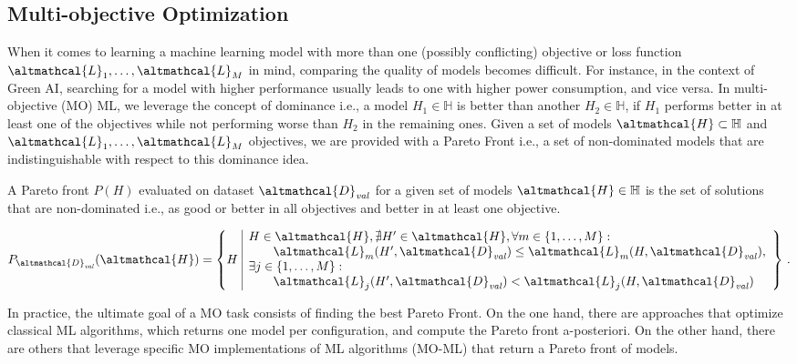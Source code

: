 \subsection{Multi-objective Optimization}


When it comes to learning a machine learning model with more than one (possibly conflicting) objective or loss function $\altmathcal{L}_1, \dots, \altmathcal{L}_M$ in mind, comparing the quality of models becomes difficult.
For instance, in the context of Green AI, searching for a model with higher performance usually leads to one with higher power consumption, and vice versa.
In multi-objective (MO) ML, we leverage the concept of dominance i.e., a model $H_1 \in \mathbb{H}$ is better than another $H_2 \in \mathbb{H}$, if $H_1$ performs better in at least one of the objectives while not performing worse than $H_2$ in the remaining ones.
Given a set of models $\altmathcal{H} \subset \mathbb{H}$ and $\altmathcal{L}_1, \dots, \altmathcal{L}_M$ objectives, we are provided with a Pareto Front i.e., a set of non-dominated models that are indistinguishable with respect to this dominance idea.

\begin{definition}
    A Pareto front $P(H)$ evaluated on dataset $\altmathcal{D}_{\mathit{val}}$ for a given set of models $\altmathcal{H} \in \mathbb{H}$ is the set of solutions that are non-dominated i.e., as good or better in all objectives and better in at least one objective.

    \begin{equation*}
        \label{eq:pareto_def}
            P_{\altmathcal{D}_{\mathit{val}}}(\altmathcal{H}) = \left\{ H \,\, \begin{array}{|l}
            H \in \altmathcal{H}, \nexists H' \in \altmathcal{H},
            \forall m \in \{1, \dots, M\} : \\
            \quad\quad\altmathcal{L}_m(H',\altmathcal{D}_{\mathit{val}}) \leq \altmathcal{L}_m(H,\altmathcal{D}_{\mathit{val}}), \\
            \exists j \in \{1, \dots, M\} : \\
            \quad\quad\altmathcal{L}_j(H',\altmathcal{D}_{\mathit{val}}) < \altmathcal{L}_j(H, \altmathcal{D}_{\mathit{val}})
            \end{array}\right\} \, .
        \end{equation*}
\end{definition}

In practice, the ultimate goal of a MO task consists of finding the best Pareto Front.
On the one hand, there are approaches that optimize classical ML algorithms, which returns one model per configuration, and compute the Pareto front a-posteriori.
On the other hand, there are others that leverage specific MO implementations of ML algorithms (MO-ML) that return a Pareto front of models.

